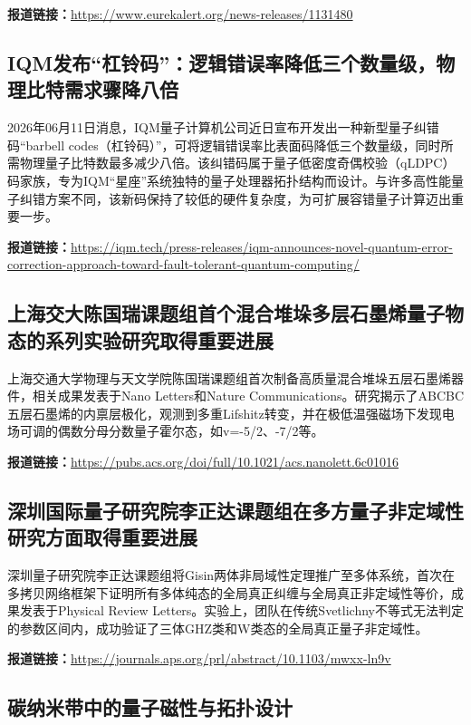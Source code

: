 \documentclass[12pt,a4paper]{ctexart}
\begin{document}
\noindent\textbf{报道链接：}\url{https://www.eurekalert.org/news-releases/1131480}

\subsection{ IQM发布“杠铃码”：逻辑错误率降低三个数量级，物理比特需求骤降八倍 }

2026年06月11日消息，IQM量子计算机公司近日宣布开发出一种新型量子纠错码“barbell codes（杠铃码）”，可将逻辑错误率比表面码降低三个数量级，同时所需物理量子比特数最多减少八倍。该纠错码属于量子低密度奇偶校验（qLDPC）码家族，专为IQM“星座”系统独特的量子处理器拓扑结构而设计。与许多高性能量子纠错方案不同，该新码保持了较低的硬件复杂度，为可扩展容错量子计算迈出重要一步。

\noindent\textbf{报道链接：}\url{https://iqm.tech/press-releases/iqm-announces-novel-quantum-error-correction-approach-toward-fault-tolerant-quantum-computing/}

\subsection{ 上海交大陈国瑞课题组首个混合堆垛多层石墨烯量子物态的系列实验研究取得重要进展 }

上海交通大学物理与天文学院陈国瑞课题组首次制备高质量混合堆垛五层石墨烯器件，相关成果发表于Nano Letters和Nature Communications。研究揭示了ABCBC五层石墨烯的内禀层极化，观测到多重Lifshitz转变，并在极低温强磁场下发现电场可调的偶数分母分数量子霍尔态，如v=-5/2、-7/2等。

\noindent\textbf{报道链接：}\url{https://pubs.acs.org/doi/full/10.1021/acs.nanolett.6c01016}

\subsection{ 深圳国际量子研究院李正达课题组在多方量子非定域性研究方面取得重要进展 }

深圳量子研究院李正达课题组将Gisin两体非局域性定理推广至多体系统，首次在多拷贝网络框架下证明所有多体纯态的全局真正纠缠与全局真正非定域性等价，成果发表于Physical Review Letters。实验上，团队在传统Svetlichny不等式无法判定的参数区间内，成功验证了三体GHZ类和W类态的全局真正量子非定域性。

\noindent\textbf{报道链接：}\url{https://journals.aps.org/prl/abstract/10.1103/mwxx-ln9v}

\subsection{ 碳纳米带中的量子磁性与拓扑设计 }
\end{document}
